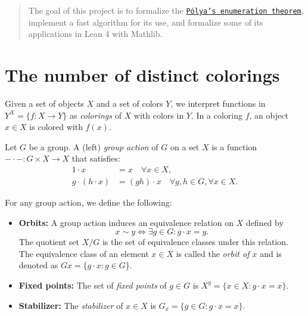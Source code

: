 %

\begin{abstract}
  The goal of this project is to formalize the \href{https://en.wikipedia.org/wiki/P%C3%B3lya_enumeration_theorem}{\texttt{Pólya's enumeration theorem}}, implement a fast algorithm for its use, and formalize some of its applications in Lean 4 with Mathlib.
\end{abstract}

\section{The number of distinct colorings}

Given a set of objects $X$ and a set of colors $Y$, we interpret functions in $Y^X = \{f : X \to Y\}$ as \emph{colorings} of $X$ with colors in $Y$. In a coloring $f$, an object $x \in X$ is colored with $f(x)$.

Let $G$ be a group. A (left) \emph{group action} of $G$ on a set $X$ is a function ${-} \cdot {-} : G \times X \to X$ that satisfies:
\begin{align*}
  1 \cdot x &= x \quad \forall x \in X,\\
  g \cdot (h \cdot x) &= (gh) \cdot x \quad \forall g, h \in G, \forall x \in X.
\end{align*}

For any group action, we define the following:
\begin{itemize}
  \item \textbf{Orbits:} A group action induces an equivalence relation on $X$ defined by
        \begin{equation*}
          x \sim y \iff \exists g \in G : g \cdot x = y.
        \end{equation*}
        The quotient set $X / G$ is the set of equivalence classes under this relation. The equivalence class of an element $x \in X$ is called the \emph{orbit of $x$} and is denoted as $Gx = \{g \cdot x : g \in G\}$.
  
  \item \textbf{Fixed points:} The set of \emph{fixed points} of $g \in G$ is $X^g = \{x \in X : g \cdot x = x\}$.
  
  \item \textbf{Stabilizer:} The \emph{stabilizer} of $x \in X$ is $G_x = \{g \in G : g \cdot x = x\}$.
\end{itemize}

